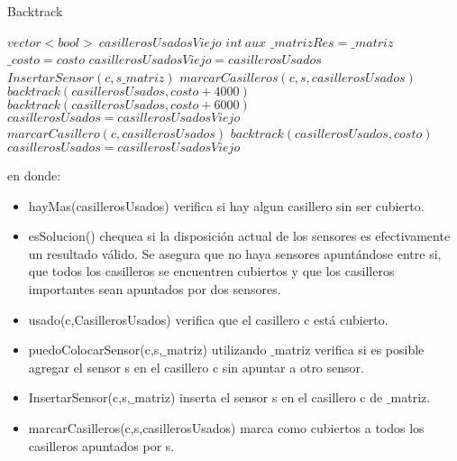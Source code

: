 \begin{algorithm}[H]
\caption{Backtrack}\label{Backtrack}
\begin{algorithmic}[1]
	\State $vector<bool>\ casillerosUsadosViejo$ 
	\State $int\ aux$
			\State $\_matrizRes=\_matriz$ 
			\State $\_costo=costo $ 
		\EndIf
	\Else
			\State $casillerosUsadosViejo = casillerosUsados$ 
							\State $InsertarSensor(c,s\_matriz)$ 
							\State $marcarCasilleros(c,s,casillerosUsados)$
								\State $backtrack(casillerosUsados,costo+4000)$
							\Else
								\State $backtrack(casillerosUsados,costo+6000)$
							\EndIf
							\State $casillerosUsados=casillerosUsadosViejo$
						\EndIf
					\EndFor
					\State $marcarCasillero(c,casillerosUsados)$
					\State $backtrack(casillerosUsados,costo)$
					\State $casillerosUsados=casillerosUsadosViejo$
				\EndIf
			\EndFor
		\EndIf
	\EndIf	
\EndProcedure
\end{algorithmic}
\end{algorithm}

en donde:

\begin{itemize}
	\item hayMas(casillerosUsados) verifica si hay algun casillero sin ser cubierto.
	\item esSolucion() chequea si la disposición actual de los sensores es efectivamente un resultado válido. Se asegura que no haya sensores apuntándose entre si, que todos los casilleros se encuentren cubiertos y que los casilleros importantes sean apuntados por dos sensores.
	\item usado(c,CasillerosUsados) verifica que el casillero c está cubierto.
	\item puedoColocarSensor(c,s,$\_$matriz) utilizando $\_$matriz verifica si es posible agregar el sensor s en el casillero c sin apuntar a otro sensor.
	\item InsertarSensor(c,s,$\_$matriz) inserta el sensor s en el casillero c de $\_$matriz.
	\item marcarCasilleros(c,s,casillerosUsados) marca como cubiertos a todos los casilleros apuntados por s.
\end{itemize}
